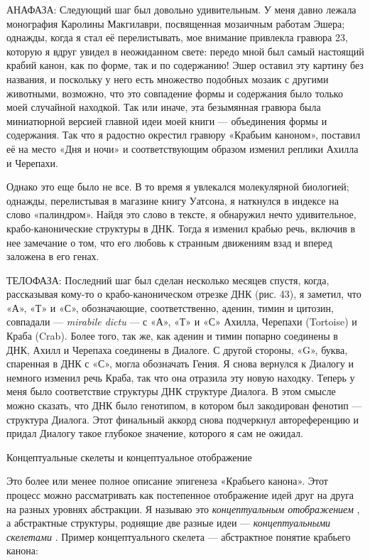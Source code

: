 \documentclass[../main.tex]{subfiles}
\begin{document}
АНАФАЗА: Следующий шаг был довольно удивительным. У меня давно лежала монография Каролины Макгилаври, посвященная мозаичным работам Эшера; однажды, когда я стал её перелистывать, мое внимание привлекла гравюра 23, которую я вдруг увидел в неожиданном свете: передо мной был самый настоящий крабий канон, как по форме, так и по содержанию! Эшер оставил эту картину без названия, и поскольку у него есть множество подобных мозаик с другими животными, возможно, что это совпадение формы и содержания было только моей случайной находкой. Так или иначе, эта безымянная гравюра была миниатюрной версией главной идеи моей книги --- объединения формы и содержания. Так что я радостно окрестил гравюру «Крабьим каноном», поставил её на место «Дня и ночи» и соответствующим образом изменил реплики Ахилла и Черепахи.

Однако это еще было не все. В то время я увлекался молекулярной биологией; однажды, перелистывая в магазине книгу Уатсона, я наткнулся в индексе на слово «палиндром». Найдя это слово в тексте, я обнаружил нечто удивительное, крабо-канонические структуры в ДНК. Тогда я изменил крабью речь, включив в нее замечание о том, что его любовь к странным движениям взад и вперед заложена в его генах.

ТЕЛОФАЗА: Последний шаг был сделан несколько месяцев спустя, когда, рассказывая кому-то о крабо-каноническом отрезке ДНК (рис. 43), я заметил, что «А», «Т» и «С», обозначающие, соответственно, аденин, тимин и цитозин, совпадали --- \emph{mirabile dictu} --- с «А», «Т» и «С» Ахилла, Черепахи (Tortoise) и Краба (Crab). Более того, так же, как аденин и тимин попарно соединены в ДНК, Ахилл и Черепаха соединены в Диалоге. С другой стороны, «G», буква, спаренная в ДНК с «С», могла обозначать Гения. Я снова вернулся к Диалогу и немного изменил речь Краба, так что она отразила эту новую находку. Теперь у меня было соответствие структуры ДНК структуре Диалога. В этом смысле можно сказать, что ДНК было генотипом, в котором был закодирован фенотип --- структура Диалога. Этот финальный аккорд снова подчеркнул автореференцию и придал Диалогу такое глубокое значение, которого я сам не ожидал.

Концептуальные скелеты и концептуальное отображение

Это более или менее полное описание эпигенеза «Крабьего канона». Этот процесс можно рассматривать как постепенное отображение идей друг на друга на разных уровнях абстракции. Я называю это \emph{концептуальным отображением} , а абстрактные структуры, роднящие две разные идеи --- \emph{концептуальными скелетами} . Пример концептуального скелета --- абстрактное понятие крабьего канона:
\end{document}

